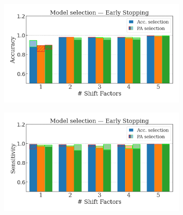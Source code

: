 \begin{figure}[H]
    \centering
    \begin{subfigure}[b]{0.6\textwidth}
        \centering
        \includegraphics[width=\textwidth]{img/results_discussion/datashift/paper_selection_ppred=1.0_met=acc.png}
    \end{subfigure}

    \begin{subfigure}[b]{0.6\textwidth}
        \centering
        \includegraphics[width=\textwidth]{img/results_discussion/datashift/paper_selection_ppred=1.0_met=sensitivity.png}
    \end{subfigure}


\end{figure}
